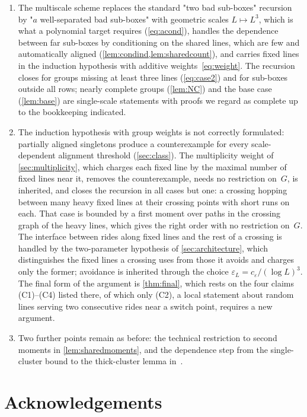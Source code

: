 \documentclass[11pt,letterpaper]{article}
\begin{document}
\begin{enumerate}
  \item The multiscale scheme replaces the standard "two bad sub-boxes" recursion by "$a$ well-separated bad sub-boxes" with geometric scales $L\mapsto L^3$, which is what a polynomial target requires (\eqref{eq:acond}), handles the dependence between far sub-boxes by conditioning on the shared lines, which are few and automatically aligned (\cref{lem:condind,lem:sharedcount}), and carries fixed lines in the induction hypothesis with additive weights~\eqref{eq:weight}. The recursion closes for groups missing at least three lines (\eqref{eq:case2}) and for sub-boxes outside all rows; nearly complete groups (\cref{lem:NC}) and the base case (\cref{lem:base}) are single-scale statements with proofs we regard as complete up to the bookkeeping indicated.
  \item The induction hypothesis with group weights is not correctly formulated: partially aligned singletons produce a counterexample for every scale-dependent alignment threshold (\cref{sec:class}). The multiplicity weight of \cref{sec:multiplicity}, which charges each fixed line by the maximal number of fixed lines near it, removes the counterexample, needs no restriction on~$G$, is inherited, and closes the recursion in all cases but one: a crossing hopping between many heavy fixed lines at their crossing points with short runs on each. That case is bounded by a first moment over paths in the crossing graph of the heavy lines, which gives the right order with no restriction on~$G$. The interface between rides along fixed lines and the rest of a crossing is handled by the two-parameter hypothesis of \cref{sec:architecture}, which distinguishes the fixed lines a crossing uses from those it avoids and charges only the former; avoidance is inherited through the choice $\varepsilon_L=c_\varepsilon/(\log L)^3$. The final form of the argument is \cref{thm:final}, which rests on the four claims (C1)--(C4) listed there, of which only (C2), a local statement about random lines serving two consecutive rides near a switch point, requires a new argument.
  \item Two further points remain as before: the technical restriction to second moments in \cref{lem:sharedmoments}, and the dependence step from the single-cluster bound to the thick-cluster lemma in~\cite{FM26}.
\end{enumerate}



\section*{Acknowledgements}
\end{document}
